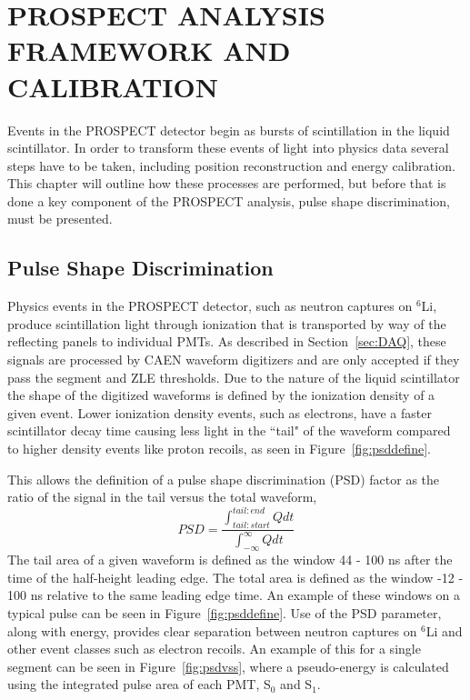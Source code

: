 \chapter{\uppercase{PROSPECT Analysis Framework and Calibration}}

Events in the PROSPECT detector begin as bursts of scintillation in the liquid scintillator. 
In order to transform these events of light into physics data several steps have to be taken, including position reconstruction and energy calibration. 
This chapter will outline how these processes are performed, but before that is done a key component of the PROSPECT analysis, pulse shape discrimination, must be presented.

\section{Pulse Shape Discrimination}

Physics events in the PROSPECT detector, such as neutron captures on $^6$Li, produce scintillation light through ionization that is transported by way of the reflecting panels to individual PMTs. 
As described in Section~\ref{sec:DAQ}, these signals are processed by CAEN waveform digitizers and are only accepted if they pass the segment and ZLE thresholds.
Due to the nature of the liquid scintillator the shape of the digitized waveforms is defined by the ionization density of a given event.
Lower ionization density events, such as electrons, have a faster scintillator decay time causing less light in the ``tail" of the waveform compared to higher density events like proton recoils, as seen in Figure~\ref{fig:psddefine}. 

This allows the definition of a pulse shape discrimination (PSD) factor as the ratio of the signal in the tail versus the total waveform,
\begin{equation}
	PSD =  \frac{\int_{tail:start}^{tail:end}Qdt}{\int_{-\infty}^{\infty}Qdt}
\end{equation}
The tail area of a given waveform is defined as the window 44 - 100 ns after the time of the half-height leading edge. 
The total area is defined as the window -12 - 100 ns relative to the same leading edge time. 
An example of these windows on a typical pulse can be seen in Figure~\ref{fig:psddefine}.
Use of the PSD parameter, along with energy, provides clear separation between neutron captures on $^6$Li and other event classes such as electron recoils. 
An example of this for a single segment can be seen in Figure~\ref{fig:psdvss}, where a pseudo-energy is calculated using the integrated pulse area of each PMT, S$_0$ and S$_1$.

